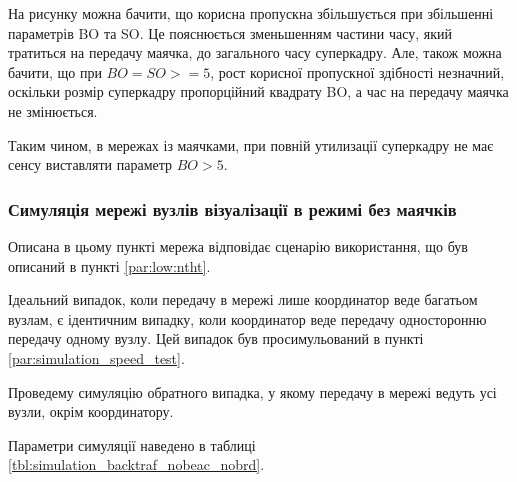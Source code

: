 \documentclass[a4paper,ukrainian,utf8,nocolumnsxix,floatsection,equationsection]{eskdtext}
\renewcommand\paragraph{\subsubsection}
\begin{document}
На рисунку можна бачити, що корисна пропускна збільшується при збільшенні параметрів BO та SO. Це пояснюється зменьшенням частини часу, який тратиться на передачу маячка, до загального часу суперкадру. Але, також можна бачити, що при $BO=SO>=5$, рост корисної пропускної здібності незначний, оскільки розмір суперкадру пропорційний квадрату BO, а час на передачу маячка не змінюється.

Таким чином, в мережах із маячками, при повній утилизації суперкадру не має сенсу виставляти параметр $BO>5$. 


% 


\paragraph{Симуляція мережі вузлів візуалізації в режимі без маячків}
\label{par:simulation_backtraf_nobeac}

Описана в цьому пункті мережа відповідає сценарію використання, що був описаний в пункті \ref{par:low:ntht}.

Ідеальний випадок, коли передачу в мережі лише координатор веде багатьом вузлам, є ідентичним випадку, коли координатор веде передачу односторонню передачу одному вузлу. Цей випадок був просимульований в пункті \ref{par:simulation_speed_test}.

Проведему симуляцію обратного випадка, у якому передачу в мережі ведуть усі вузли, окрім координатору. 

Параметри симуляції наведено в таблиці \ref{tbl:simulation_backtraf_nobeac_nobrd}.
\end{document}
